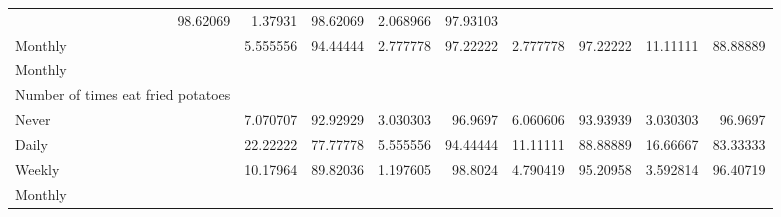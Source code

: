 \documentclass{article}
\begin{document}
\begin{table}[!h]
{\begin{tabular}{lllllllll}
				\multicolumn{1}{r}{98.62069} &
				\multicolumn{1}{r}{1.37931} &
				\multicolumn{1}{r}{98.62069} &
				\multicolumn{1}{r}{2.068966} &
				\multicolumn{1}{r}{97.93103} \\
				\multicolumn{1}{l}{\hspace{5em}Monthly} &
				\multicolumn{1}{|r}{5.555556} &
				\multicolumn{1}{r}{94.44444} &
				\multicolumn{1}{r}{2.777778} &
				\multicolumn{1}{r}{97.22222} &
				\multicolumn{1}{r}{2.777778} &
				\multicolumn{1}{r}{97.22222} &
				\multicolumn{1}{r}{11.11111} &
				\multicolumn{1}{r}{88.88889} \\
				\multicolumn{1}{l}{\hspace{3em}Monthly} &
				\multicolumn{1}{|r}{} &
				\multicolumn{1}{r}{} &
				\multicolumn{1}{r}{} &
				\multicolumn{1}{r}{} &
				\multicolumn{1}{r}{} &
				\multicolumn{1}{r}{} &
				\multicolumn{1}{r}{} &
				\multicolumn{1}{r}{} \\
				\multicolumn{1}{l}{\hspace{4em}Number of times eat fried potatoes} &
				\multicolumn{1}{|r}{} &
				\multicolumn{1}{r}{} &
				\multicolumn{1}{r}{} &
				\multicolumn{1}{r}{} &
				\multicolumn{1}{r}{} &
				\multicolumn{1}{r}{} &
				\multicolumn{1}{r}{} &
				\multicolumn{1}{r}{} \\
				\multicolumn{1}{l}{\hspace{5em}Never} &
				\multicolumn{1}{|r}{7.070707} &
				\multicolumn{1}{r}{92.92929} &
				\multicolumn{1}{r}{3.030303} &
				\multicolumn{1}{r}{96.9697} &
				\multicolumn{1}{r}{6.060606} &
				\multicolumn{1}{r}{93.93939} &
				\multicolumn{1}{r}{3.030303} &
				\multicolumn{1}{r}{96.9697} \\
				\multicolumn{1}{l}{\hspace{5em}Daily} &
				\multicolumn{1}{|r}{22.22222} &
				\multicolumn{1}{r}{77.77778} &
				\multicolumn{1}{r}{5.555556} &
				\multicolumn{1}{r}{94.44444} &
				\multicolumn{1}{r}{11.11111} &
				\multicolumn{1}{r}{88.88889} &
				\multicolumn{1}{r}{16.66667} &
				\multicolumn{1}{r}{83.33333} \\
				\multicolumn{1}{l}{\hspace{5em}Weekly} &
				\multicolumn{1}{|r}{10.17964} &
				\multicolumn{1}{r}{89.82036} &
				\multicolumn{1}{r}{1.197605} &
				\multicolumn{1}{r}{98.8024} &
				\multicolumn{1}{r}{4.790419} &
				\multicolumn{1}{r}{95.20958} &
				\multicolumn{1}{r}{3.592814} &
				\multicolumn{1}{r}{96.40719} \\
				\multicolumn{1}{l}{\hspace{5em}Monthly} &

\end{tabular}}
\end{table}
\end{document}
